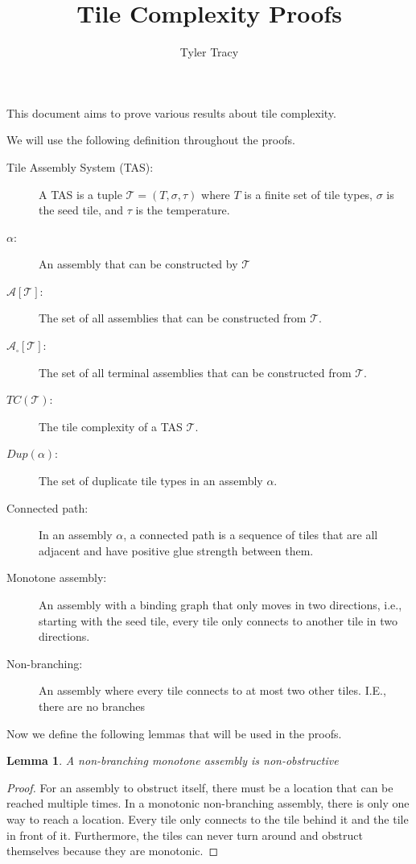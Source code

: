 \documentclass[12pt]{article}
\title{Tile Complexity Proofs}
\author{Tyler Tracy}
\newtheorem{lemma}[theorem]{Lemma}
\begin{document}
\maketitle

This document aims to prove various results about tile complexity.

We will use the following definition throughout the proofs.

\begin{description}
    \item[Tile Assembly System (TAS):] A TAS is a tuple $\mathcal{T} = (T, \sigma, \tau)$ where $T$ is a finite set of tile types, $\sigma$ is the seed tile, and $\tau$ is the temperature.
    \item[$\alpha$:] An assembly that can be constructed by $\mathcal{T}$
    \item[{$\mathcal{A}[\mathcal{T}]$}:] The set of all assemblies that can be constructed from $\mathcal{T}$.
    \item[{$\mathcal{A}_{\square}[\mathcal{T}]$}:] The set of all terminal assemblies that can be constructed from $\mathcal{T}$.
    \item[{$TC(\mathcal{T})$}:] The tile complexity of a TAS $\mathcal{T}$.
    \item[$Dup(\alpha)$:] The set of duplicate tile types in an assembly $\alpha$.
    \item[Connected path:] In an assembly $\alpha$, a connected path is a sequence of tiles that are all adjacent and have positive glue strength between them.
    \item[Monotone assembly:] An assembly with a binding graph that only moves in two directions, i.e., starting with the seed tile, every tile only connects to another tile in two directions.
    \item[Non-branching:] An assembly where every tile connects to at most two other tiles. I.E., there are no branches
\end{description}


Now we define the following lemmas that will be used in the proofs.

\begin{lemma}
    A non-branching monotone assembly is non-obstructive
\end{lemma}

\begin{proof}
    For an assembly to obstruct itself, there must be a location that can be reached multiple times. In a monotonic non-branching assembly, there is only one way to reach a location. Every tile only connects to the tile behind it and the tile in front of it. Furthermore, the tiles can never turn around and obstruct themselves because they are monotonic.
\end{proof}
\end{document}

